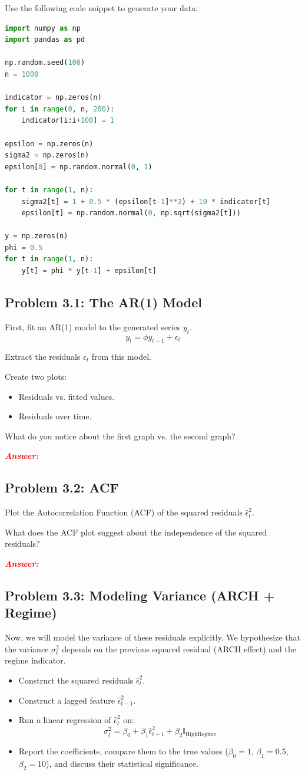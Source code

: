 \documentclass[11pt, letterpaper]{article}
\newcommand{\subproblem}[1]{\subsection*{Problem #1}}
\newcommand{\answer}{\textbf{\textit{\textcolor{red}{Answer:}}}\\}
\begin{document}
Use the following code snippet to generate your data:
    \begin{lstlisting}[language=Python]
import numpy as np
import pandas as pd

np.random.seed(100)
n = 1000

indicator = np.zeros(n)
for i in range(0, n, 200):
    indicator[i:i+100] = 1 

epsilon = np.zeros(n)
sigma2 = np.zeros(n)
epsilon[0] = np.random.normal(0, 1)

for t in range(1, n):
    sigma2[t] = 1 + 0.5 * (epsilon[t-1]**2) + 10 * indicator[t]
    epsilon[t] = np.random.normal(0, np.sqrt(sigma2[t]))

y = np.zeros(n)
phi = 0.5
for t in range(1, n):
    y[t] = phi * y[t-1] + epsilon[t]\end{lstlisting}

\subproblem{3.1: The AR(1) Model}

First, fit an AR(1) model to the generated series $y_t$.
$$
y_t = \phi y_{t-1} + \epsilon_t
$$

Extract the residuals $\epsilon_t$ from this model.

Create two plots:
\begin{itemize}
    \item Residuals vs. fitted values.
    \item Residuals over time.
\end{itemize}
What do you notice about the first graph vs. the second graph?

\answer

\subproblem{3.2: ACF}
Plot the Autocorrelation Function (ACF) of the squared residuals $\hat{\epsilon}_t^2$.

What does the ACF plot suggest about the independence of the squared residuals?

\answer

\subproblem{3.3: Modeling Variance (ARCH + Regime)}
Now, we will model the variance of these residuals explicitly. We hypothesize that the variance $\sigma_t^2$ depends on the previous squared residual (ARCH effect) and the regime indicator.
\begin{itemize}
    \item Construct the squared residuals $\hat{\epsilon}_t^2$.
    \item Construct a lagged feature $\hat{\epsilon}_{t-1}^2$.
    \item Run a linear regression of $\hat{\epsilon}_t^2$ on:
    $$ \sigma_t^2 = \beta_0 + \beta_1 \hat{\epsilon}_{t-1}^2 + \beta_2 \mathbb{I}_{\text{HighRegime}} $$
    \item Report the coefficients, compare them to the true values ($\beta_0=1$, $\beta_1=0.5$, $\beta_2=10$), and discuss their statistical significance.
\end{itemize}
\end{document}
